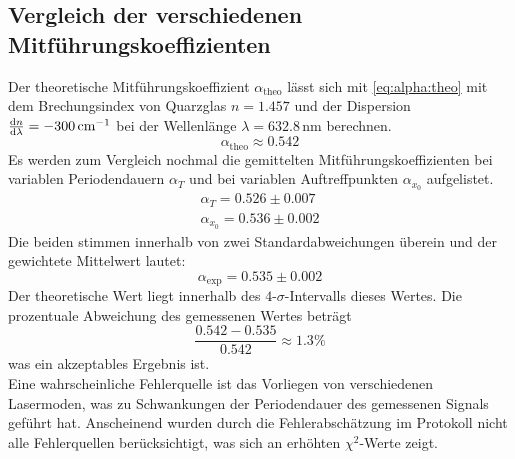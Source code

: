 \subsection{Vergleich der verschiedenen Mitführungskoeffizienten}
Der theoretische Mitführungskoeffizient $\alpha_{\text{theo}}$ lässt sich mit \autoref{eq:alpha:theo} mit dem Brechungsindex von Quarzglas $n=1.457$ 
und der Dispersion $\frac{\mathrm{d} n}{\mathrm{d} \lambda} = -300\,\text{cm}^{-1}$ bei der Wellenlänge  $\lambda = 632.8$\,nm berechnen.
\begin{equation}
  \alpha_{\text{theo}} \approx 0.542
\end{equation}
Es werden zum Vergleich nochmal die gemittelten Mitführungskoeffizienten bei variablen Periodendauern $\alpha_T$ und bei variablen Auftreffpunkten 
$\alpha_{x_0}$ aufgelistet.
\begin{equation}
\begin{split}
  \alpha_T = 0.526 \pm 0.007 \\
  \alpha_{x_0} = 0.536 \pm 0.002
\end{split}
\end{equation}
Die beiden stimmen innerhalb von zwei Standardabweichungen überein und der gewichtete Mittelwert lautet:
\begin{equation}
  \alpha_{\text{exp}} = 0.535 \pm 0.002
\end{equation}
Der theoretische Wert liegt innerhalb des $4$-$\sigma$-Intervalls dieses Wertes. Die prozentuale Abweichung des gemessenen Wertes beträgt
\begin{equation}
  \frac{0.542 - 0.535}{0.542} \approx 1.3 \%
\end{equation}
was ein akzeptables Ergebnis ist. \\
Eine wahrscheinliche Fehlerquelle ist das Vorliegen von verschiedenen Lasermoden, was zu Schwankungen der Periodendauer des  gemessenen Signals 
geführt hat. Anscheinend wurden durch die Fehlerabschätzung im Protokoll nicht alle Fehlerquellen berücksichtigt, was sich an erhöhten 
$\chi^2$-Werte zeigt.